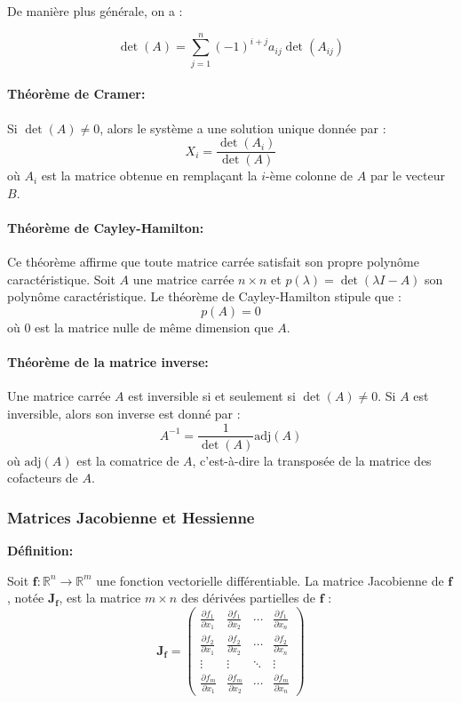 De manière plus générale, on a :


\[
\det(A) = \sum_{j=1}^{n} (-1)^{i+j} a_{ij} \det(A_{ij})
\]


\paragraph{Théorème de Cramer:}
Si \(\det(A) \neq 0\), alors le système a une solution unique donnée par :
\[
X_i = \frac{\det(A_i)}{\det(A)}
\]
où \(A_i\) est la matrice obtenue en remplaçant la \(i\)-ème colonne de \(A\) par le vecteur \(B\).

\paragraph{Théorème de Cayley-Hamilton:}
Ce théorème affirme que toute matrice carrée satisfait son propre polynôme caractéristique. Soit \(A\) une matrice carrée \(n \times n\) et \(p(\lambda) = \det(\lambda I - A)\) son polynôme caractéristique. Le théorème de Cayley-Hamilton stipule que :
\[
p(A) = 0
\]
où \(0\) est la matrice nulle de même dimension que \(A\).

\paragraph{Théorème de la matrice inverse:}
Une matrice carrée \(A\) est inversible si et seulement si \(\det(A) \neq 0\). Si \(A\) est inversible, alors son inverse est donné par :
\[
A^{-1} = \frac{1}{\det(A)} \text{adj}(A)
\]
où \(\text{adj}(A)\) est la comatrice de \(A\), c'est-à-dire la transposée de la matrice des cofacteurs de \(A\).


\subsubsection{Matrices Jacobienne et Hessienne}


\textbf{Définition:}

Soit $\mathbf{f} : \mathbb{R}^n \to \mathbb{R}^m$ une fonction vectorielle différentiable. La matrice Jacobienne de $\mathbf{f}$, notée $\mathbf{J_f}$, est la matrice $m \times n$ des dérivées partielles de $\mathbf{f}$ :
\[
\mathbf{J_f} = \begin{pmatrix}
\frac{\partial f_1}{\partial x_1} & \frac{\partial f_1}{\partial x_2} & \cdots & \frac{\partial f_1}{\partial x_n} \\
\frac{\partial f_2}{\partial x_1} & \frac{\partial f_2}{\partial x_2} & \cdots & \frac{\partial f_2}{\partial x_n} \\
\vdots & \vdots & \ddots & \vdots \\
\frac{\partial f_m}{\partial x_1} & \frac{\partial f_m}{\partial x_2} & \cdots & \frac{\partial f_m}{\partial x_n}
\end{pmatrix}
\]

